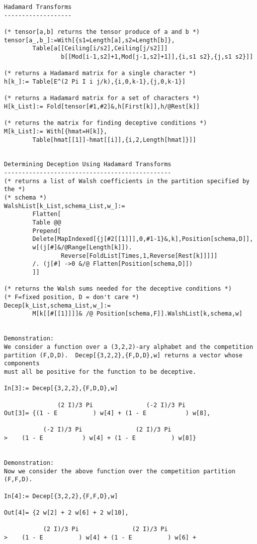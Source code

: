 \begin{verbatim}
Hadamard Transforms
-------------------

(* tensor[a,b] returns the tensor produce of a and b *)
tensor[a_,b_]:=With[{s1=Length[a],s2=Length[b]},
        Table[a[[Ceiling[i/s2],Ceiling[j/s2]]]
                b[[Mod[i-1,s2]+1,Mod[j-1,s2]+1]],{i,s1 s2},{j,s1 s2}]]

(* returns a Hadamard matrix for a single character *)
h[k_]:= Table[E^(2 Pi I i j/k),{i,0,k-1},{j,0,k-1}]

(* returns a Hadamard matrix for a set of characters *)
H[k_List]:= Fold[tensor[#1,#2]&,h[First[k]],h/@Rest[k]]

(* returns the matrix for finding deceptive conditions *)
M[k_List]:= With[{hmat=H[k]},
        Table[hmat[[1]]-hmat[[i]],{i,2,Length[hmat]}]]


Determining Deception Using Hadamard Transforms
-----------------------------------------------
(* returns a list of Walsh coefficients in the partition specified by the *)
(* schema *)
WalshList[k_List,schema_List,w_]:=
        Flatten[
        Table @@
        Prepend[
        Delete[MapIndexed[{j[#2[[1]]],0,#1-1}&,k],Position[schema,D]],
        w[(j[#]&/@Range[Length[k]]).
                Reverse[FoldList[Times,1,Reverse[Rest[k]]]]]
        /. (j[#] ->0 &/@ Flatten[Position[schema,D]])
        ]]

(* returns the Walsh sums needed for the deceptive conditions *)
(* F=fixed position, D = don't care *)
Decep[k_List,schema_List,w_]:=
        M[k[[#[[1]]]]& /@ Position[schema,F]].WalshList[k,schema,w]


Demonstration:
We consider a function over a (3,2,2)-ary alphabet and the competition
partition (F,D,D).  Decep[{3,2,2},{F,D,D},w] returns a vector whose components
must all be positive for the function to be deceptive.

In[3]:= Decep[{3,2,2},{F,D,D},w]

               (2 I)/3 Pi               (-2 I)/3 Pi
Out[3]= {(1 - E          ) w[4] + (1 - E           ) w[8], 
 
           (-2 I)/3 Pi               (2 I)/3 Pi
>    (1 - E           ) w[4] + (1 - E          ) w[8]}


Demonstration:
Now we consider the above function over the competition partition (F,F,D).

In[4]:= Decep[{3,2,2},{F,F,D},w]

Out[4]= {2 w[2] + 2 w[6] + 2 w[10], 
 
           (2 I)/3 Pi               (2 I)/3 Pi
>    (1 - E          ) w[4] + (1 - E          ) w[6] + 
 

\end{verbatim}
